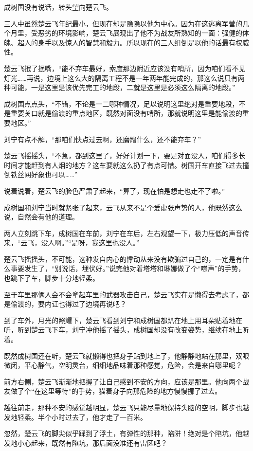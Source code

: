 成树国没有说话，转头望向楚云飞。

三人中虽然楚云飞年纪最小，但现在却是隐隐以他为中心。因为在这逃离军营的几个月里，受恶劣的环境影响，楚云飞展现出了他不为战友所熟知的一面：强健的体魄、超人的身手以及惊人的智慧和毅力。所以现在的三人组倒是以他的话最有权威性。

楚云飞抿了抿嘴，“能不弃车最好，索度那边附近应该没有哨所，因为咱们看不见灯光……再说，边境上这么大的隔离工程不是一年两年能完成的，那这么说只有两种可能，一是这里是该优先完工的地段，二就是这里是必须这么隔离的地段。”

成树国点点头，“不错，不论是一二哪种情况，足以说明这里绝对是重要地段，不是重要关口就是偷渡的重点地区，既然对面没有哨所，那就说明这里是能偷渡的重要地区。”

刘宁有点不解，“那咱们快点过去啊，还磨蹭什么，还不能弃车？”

楚云飞摇摇头，“不急，都到这里了，好好计划一下，要是对面没人，咱们得多长时间才能赶到有人烟的地方？这车要就这么扔了有点可惜。树国开车直接飞过去撞倒铁丝网好象也可以……”

说着说着，楚云飞的脸色严肃了起来，“算了，现在怕是想走也走不了啦。”

成树国和刘宁当时就紧张了起来，云飞从来不是个爱虚张声势的人，他既然这么说，自然会有他的道理。

两人立刻跳下车，成树国在车前，刘宁在车后，左右观望一下，极力压低的声音传来，“云飞，没人啊。”“是呀，我这里也没人。”

楚云飞摇摇头，不可能，这种发自内心的悸动从来没有欺骗过自己的，一定是有什么事要发生了，“别说话，埋伏好。”说完他对着塔塔和琳娜做了个“噤声”的手势，也跳下了车，脚步十分地轻柔。

至于车里那俩人会不会拿起车里的武器攻击自己，楚云飞实在是懒得去考虑了，都是偷渡的，要内讧也得过了边境再说吧？

到了车外，月光的照耀下，楚云飞看到刘宁和成树国都趴在地上用耳朵贴着地在听，听到楚云飞下车，刘宁冲他摇了摇头，成树国却没有改变姿势，继续在地上听着。

既然成树国还在听，楚云飞就懒得也把身子贴到地上了，他静静地站在那里，双眼微闭，平心静气，空明灵台，细细地品味着那种感觉，危险，会是来自哪里呢？

前方右侧，楚云飞渐渐地把握了让自己感到不安的方向，应该是那里。他向两个战友做了个“在这里等待”的手势，猫着身子向那危险的地方慢慢挪了过去。

越往前走，那种不安的感觉越明显，楚云飞只能尽量地保持头脑的空明，脚步也越发地轻柔。半个小时过去了，他才走了一百米。

忽然，楚云飞的脚尖似乎踩到了浮土，有弹性的那种，陷阱！绝对是个陷坑，他越发地小心起来，既然有陷坑，那后面没准还有雷区吧？

